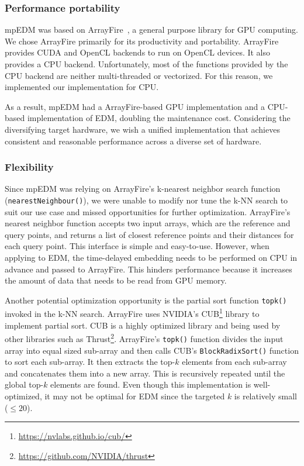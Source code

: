 \documentclass[conference]{IEEEtran}
\begin{document}
\subsubsection{Performance portability}

mpEDM was based on ArrayFire~\cite{Malcolm2012}, a general purpose library for
GPU computing. We chose ArrayFire primarily for its productivity and
portability. ArrayFire provides CUDA and OpenCL backends to run on OpenCL
devices. It also provides a CPU backend. Unfortunately, most of the functions
provided by the CPU backend are neither multi-threaded or vectorized. For this
reason, we implemented our implementation for CPU\@.

As a result, mpEDM had a ArrayFire-based GPU implementation and a CPU-based
implementation of EDM, doubling the maintenance cost. Considering the
diversifying target hardware, we wish a unified implementation that achieves
consistent and reasonable performance across a diverse set of hardware.

\subsubsection{Flexibility}

Since mpEDM was relying on ArrayFire's k-nearest neighbor search function
(\texttt{nearestNeighbour()}), we were unable to modify nor tune the k-NN
search to suit our use case and missed opportunities for further optimization.
ArrayFire's nearest neighbor function accepts two input arrays, which are the
reference and query points, and returns a list of closest reference points and
their distances for each query point. This interface is simple and
easy-to-use. However, when applying to EDM, the time-delayed embedding needs
to be performed on CPU in advance and passed to ArrayFire. This hinders
performance because it increases the amount of data that needs to be read from
GPU memory.

Another potential optimization opportunity is the partial sort function
\texttt{topk()} invoked in the k-NN search. ArrayFire uses NVIDIA's
CUB\footnote{\url{https://nvlabs.github.io/cub/}} library to implement partial
sort. CUB is a highly optimized library and being used by other libraries such
as Thrust\footnote{\url{https://github.com/NVIDIA/thrust}}. ArrayFire's
\texttt{topk()} function divides the input array into equal sized sub-array
and then calls CUB's \texttt{BlockRadixSort()} function to sort each
sub-array. It then extracts the top-$k$ elements from each sub-array and
concatenates them into a new array. This is recursively repeated until the
global top-$k$ elements are found. Even though this implementation is
well-optimized, it may not be optimal for EDM since the targeted $k$ is
relatively small ($\leq 20$).
\end{document}
